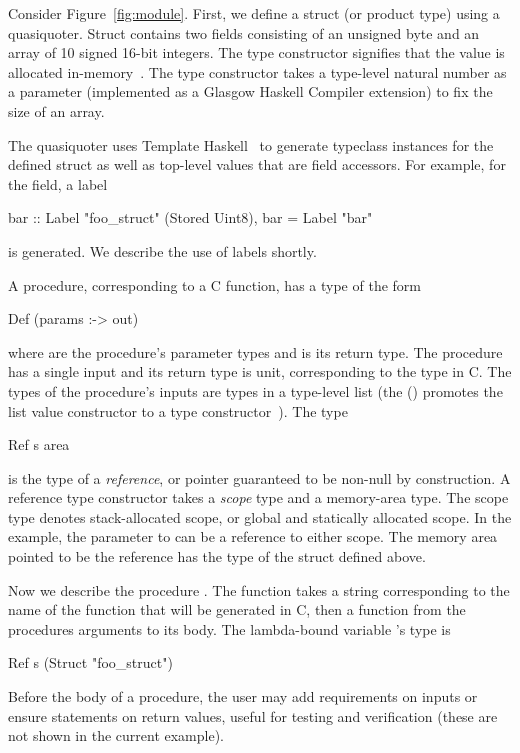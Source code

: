Consider Figure~\ref{fig:module}.  First, we define a struct (or product type)
using a quasiquoter.  Struct  contains two fields
consisting of an unsigned byte and an array of 10 signed 16-bit integers.  The
 type constructor signifies that the value is allocated
in-memory~\cite{memareas}.  The  type constructor takes a type-level
natural number as a parameter (implemented as a Glasgow Haskell Compiler
extension) to fix the size of an array.

The quasiquoter uses Template Haskell~\cite{th} to generate
typeclass instances for the defined struct as well as top-level values that are
field accessors.  For example, for the  field, a label
\begin{code}
bar :: Label "foo\_struct" (Stored Uint8),
bar = Label "bar"
\end{code}
\noindent
is generated.  We describe the use of labels shortly.

A procedure, corresponding to a C function, has a type of the form
\begin{code}
Def (params :-> out)
\end{code}
\noindent
where  are the procedure's parameter types and  is its return
type.  The procedure  has a single input and its return type is
unit, corresponding to the  type in C.  The types of the procedure's
inputs are types in a type-level list (the () promotes the list value
constructor to a type constructor~\cite{datakinds}).  The type
\begin{code}
Ref s area
\end{code}
\noindent
is the type of a \emph{reference}, or pointer guaranteed to be non-null by
construction.  A reference type constructor takes a \emph{scope} type and a
memory-area type.  The scope type denotes stack-allocated scope, or global and
statically allocated scope.  In the example, the parameter to  can
be a reference to either scope.  The memory area pointed to be the reference
has the type of the struct defined above.

Now we describe the procedure .  The function  takes a
string corresponding to the name of the function that will be generated in C,
then a function from the procedures arguments to its body.  The lambda-bound
variable 's type is
\begin{code}
Ref s (Struct "foo\_struct")
\end{code}
\noindent
Before the body of a procedure, the user may add requirements on inputs or
ensure statements on return values, useful for testing and verification (these
are not shown in the current example).

